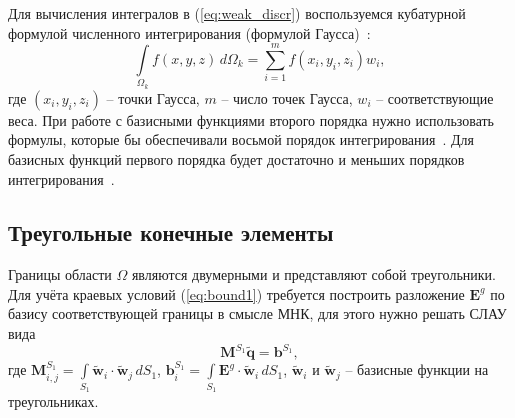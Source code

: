 \documentclass[a4paper,14pt]{article}
\begin{document}
Для вычисления интегралов в (\ref{eq:weak_discr}) воспользуемся кубатурной формулой численного интегрирования (формулой Гаусса)~\citep{misovskih}:
\begin{equation*}
	\int\limits_{\Omega_k} f(x, y, z) \,d\Omega_k = \sum\limits_{i = 1}^m f( x_i , y_i , z_i ) w_i ,
\end{equation*}
где $(x_i , y_i , z_i )$ -- точки Гаусса, $m$ -- число точек Гаусса, $w_i$ -- соответствующие веса. При работе с базисными функциями второго порядка нужно использовать формулы, которые бы обеспечивали восьмой порядок интегрирования~\citep{zhang_integration}. Для базисных функций первого порядка будет достаточно и меньших порядков интегрирования~\citep{tet_integration, misovskih}.


\subsection{Треугольные конечные элементы}

Границы области $\Omega$ являются двумерными и представляют собой треугольники. Для учёта краевых условий (\ref{eq:bound1}) требуется построить разложение $\mathbf{E}^g$ по базису соответствующей границы в смысле МНК, для этого нужно решать СЛАУ вида
\begin{equation}
	\mathbf{M}^{S_1} \tilde{\mathbf{q}} = \mathbf{b}^{S_1} ,
	\label{eq:bound_mnk}
\end{equation}
где $\displaystyle \mathbf{M}^{S_1}_{i,j} = \int\limits_{S_1} \tilde{\mathbf{w}}_i \cdot \tilde{\mathbf{w}}_j \,d S_1$, $\displaystyle \mathbf{b}^{S_1}_{i} = \int\limits_{S_1} \mathbf{E}^g \cdot \tilde{\mathbf{w}}_i \,d S_1$, $\tilde{\mathbf{w}}_i$ и $\tilde{\mathbf{w}}_j$ -- базисные функции на треугольниках.
\end{document}
